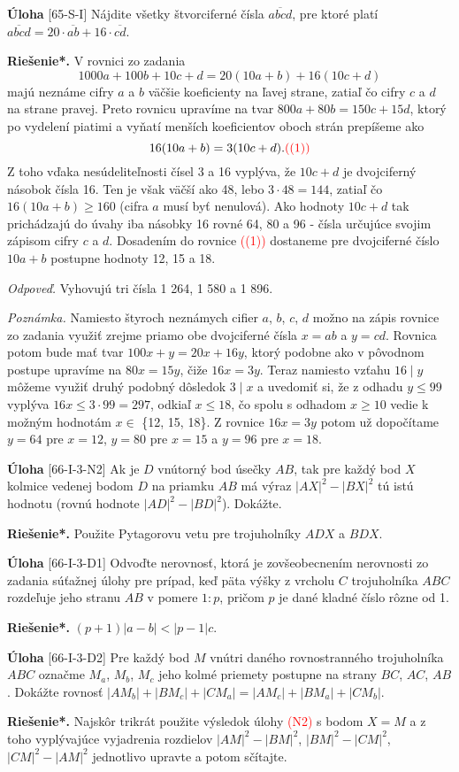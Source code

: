 \documentclass{article}
\newcommand{\rieh}{\textbf{Riešenie*.} }
\newcommand\todo[1]{\noindent\textcolor{red}{(#1)}}
\newcommand{\problem}[3]{
  \begin{tcolorbox}[breakable,notitle,boxrule=0pt,colback=light-gray,colframe=light-gray]
    \textbf{Úloha}
    [#1] #2
  \end{tcolorbox}
  \noindent#3
}
\begin{document}
\problem{65-S-I}{
 Nájdite všetky štvorciferné čísla $\overline{abcd}$, pre ktoré platí $\overline{abcd} = 20 \cdot \overline{ab} + 16 \cdot \overline{cd}$.
}{
\rieh V rovnici zo zadania
$$1 000a + 100b + 10c + d = 20(10a + b) + 16(10c + d)$$
majú neznáme cifry $a$ a $b$ väčšie koeficienty na ľavej strane, zatiaľ čo cifry $c$ a $d$ na strane pravej. Preto rovnicu upravíme na tvar $800a + 80b = 150c + 15d$, ktorý po vydelení piatimi a vyňatí menších koeficientov oboch strán prepíšeme ako
$$16(10a + b) = 3(10c + d). \todo{(1)}$$
Z toho vďaka nesúdeliteľnosti čísel 3 a 16 vyplýva, že $10c + d$ je dvojciferný násobok čísla 16. Ten je však väčší ako 48, lebo $3 \cdot 48 = 144$, zatiaľ čo $16(10a + b) \geq 160$ (cifra $a$ musí byť nenulová). Ako hodnoty $10c + d$ tak prichádzajú do úvahy iba násobky 16 rovné 64, 80 a 96 - čísla určujúce svojim zápisom cifry $c$ a $d$. Dosadením do rovnice \todo{(1)} dostaneme pre dvojciferné číslo $10a + b$ postupne hodnoty 12, 15 a 18.

\textit{Odpoveď.} Vyhovujú tri čísla 1 264, 1 580 a 1 896.

\textit{Poznámka.} Namiesto štyroch neznámych cifier $a$, $b$, $c$, $d$ možno na zápis rovnice zo zadania využiť zrejme priamo obe dvojciferné čísla $x = ab$ a $y = cd$. Rovnica potom bude mať tvar $100x+y = 20x+16y$, ktorý podobne ako v pôvodnom postupe upravíme na $80x = 15y$, čiže $16x = 3y$. Teraz namiesto vzťahu $16 \mid y$ môžeme využiť druhý podobný dôsledok $3 \mid x$ a uvedomiť si, že z odhadu $y \leq 99$  vyplýva $16x \leq 3 \cdot 99 = 297$, odkiaľ $x \leq 18$, čo spolu s odhadom $x \geq 10$ vedie k možným hodnotám $x \in$ \{12, 15, 18\}. Z rovnice $16x = 3y$ potom už dopočítame $y = 64$ pre $x = 12$, $y = 80$ pre $x = 15$ a  $y = 96$ pre $x = 18$.
}



\problem{66-I-3-N2}{
Ak je $D$ vnútorný bod úsečky $AB$, tak pre každý bod $X$ kolmice vedenej bodom $D$ na priamku $AB$ má výraz $|AX|^2-|BX|^2$ tú istú hodnotu (rovnú hodnote $|AD|^2 -|BD|^2$). Dokážte.
}{
\rieh Použite Pytagorovu vetu pre trojuholníky $ADX$ a $BDX$.
}

\problem{66-I-3-D1}{
Odvoďte nerovnosť, ktorá je zovšeobecnením nerovnosti zo zadania súťažnej úlohy pre prípad, keď päta výšky z vrcholu $C$ trojuholníka $ABC$ rozdeľuje jeho stranu $AB$ v pomere $1 : p$, pričom $p$ je dané kladné číslo rôzne od 1. 
}{
\rieh $(p + 1)|a - b| < |p - 1|c.$
}


\problem{66-I-3-D2}{
Pre každý bod $M$ vnútri daného rovnostranného trojuholníka $ABC$ označme $M_a$, $M_b$, $M_c$ jeho kolmé priemety postupne na strany $BC$, $AC$, $AB$. Dokážte rovnosť $|AM_b|+ |BM_c| + |CM_a| = |AM_c| + |BM_a| + |CM_b|$.
}{
\rieh Najskôr trikrát použite výsledok úlohy \todo{N2} s bodom $X = M$ a z toho vyplývajúce vyjadrenia rozdielov $|AM|^2 - |BM|^2$, $|BM|^2- |CM|^2$, $|CM|^2 -|AM|^2$ jednotlivo upravte a potom sčítajte.
}
\end{document}
